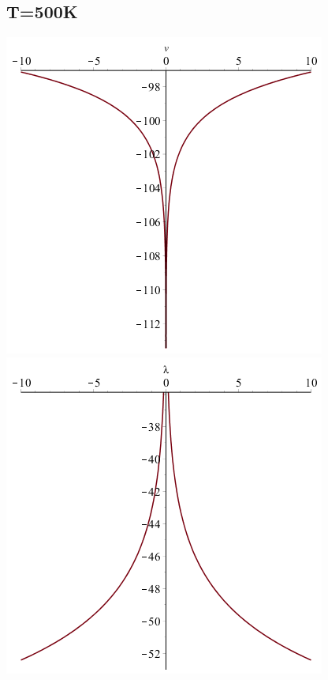 \documentclass[11pt]{article} %
\begin{document}
\begin{enumerate}[i.)]
\subsection*{T=500K}
\includegraphics[scale=.5]{plots/problem10plot500alog.png}
\includegraphics[scale=.5]{plots/problem10plot500blog.png} \\


\end{enumerate}
\end{document}
